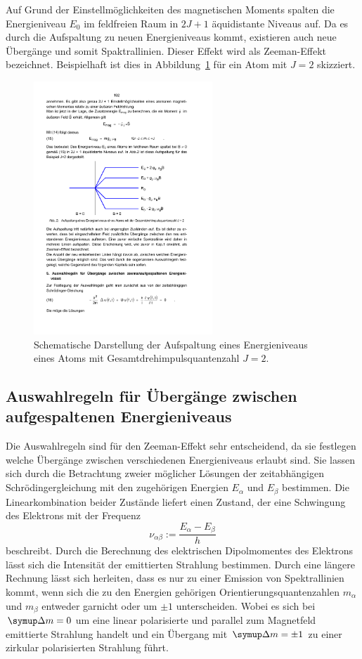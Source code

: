 Auf Grund der Einstellmöglichkeiten des magnetischen Moments spalten die Energieniveau
$E_0$ im feldfreien Raum in $2J+1$ äquidistante Niveaus auf. Da es durch die Aufspaltung
zu neuen Energieniveaus kommt, existieren auch neue Übergänge und somit Spaktrallinien.
Dieser Effekt wird als Zeeman-Effekt bezeichnet.
Beispielhaft ist dies in Abbildung~\ref{fig:aufspaltung} für ein Atom mit $J=2$
skizziert.
\begin{figure}
    \centering
    \includegraphics[width=0.6\textwidth]{graphics/aufspaltung.pdf}
    \caption{Schematische Darstellung der Aufspaltung eines Energieniveaus eines Atoms
    mit Gesamtdrehimpulsquantenzahl $J=2$.\cite{anleitung}}
    \label{fig:aufspaltung}
\end{figure}

\subsection{Auswahlregeln für Übergänge zwischen aufgespaltenen Energieniveaus}
\label{sec:auswahl}
Die Auswahlregeln sind für den Zeeman-Effekt sehr entscheidend, da sie festlegen welche
Übergänge zwischen verschiedenen Energieniveaus erlaubt sind.
Sie lassen sich durch die Betrachtung zweier möglicher Lösungen der zeitabhängigen
Schrödingergleichung mit den zugehörigen Energien $E_{\alpha}$ und $E_{\beta}$ bestimmen.
Die Linearkombination beider Zustände liefert einen Zustand, der eine Schwingung des
Elektrons mit der Frequenz
\begin{equation}
    \nu_{\alpha\beta}:=\frac{E_{\alpha}-E_{\beta}}{h}
\end{equation}
beschreibt.
Durch die Berechnung des elektrischen Dipolmomentes des Elektrons lässt sich die Intensität
der emittierten Strahlung bestimmen. Durch eine längere Rechnung lässt sich herleiten, dass
es nur zu einer Emission von Spektrallinien kommt, wenn sich die zu den Energien
gehörigen Orientierungsquantenzahlen $m_{\alpha}$ und $m_{\beta}$ entweder garnicht
oder um $\pm 1$ unterscheiden. Wobei es sich bei $\upD m=0$ um eine linear
polarisierte und parallel zum Magnetfeld emittierte Strahlung handelt und
ein Übergang mit $\upD m=\pm1$ zu einer zirkular polarisierten Strahlung führt.

